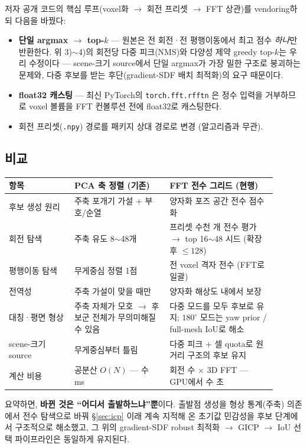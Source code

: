 저자 공개 코드의 핵심 루프(voxel화 $\to$ 회전 프리셋 $\to$ FFT 상관)를
vendoring하되 다음을 바꿨다:
\begin{itemize}
  \item \textbf{단일 argmax $\to$ top-$k$} --- 원본은 전 회전·전
  평행이동에서 최고 점수 \emph{하나}만 반환한다. 위 3)$\sim$4)의 회전당
  다중 피크(NMS)와 다양성 제약 greedy top-$k$는 우리 수정이다 ---
  scene-크기 source에서 단일 argmax가 가장 밀한 구조로 붕괴하는 문제와,
  다중 후보를 받는 후단(gradient-SDF 배치 최적화)의 요구 때문이다.
  \item \textbf{float32 캐스팅} --- 최신 PyTorch의 \texttt{torch.fft.rfftn}
  은 정수 입력을 거부하므로 voxel 볼륨을 FFT 컨볼루션 전에 float32로
  캐스팅한다.
  \item 회전 프리셋(\texttt{.npy}) 경로를 패키지 상대 경로로 변경
  (알고리즘과 무관).
\end{itemize}

\subsection{비교}

\begin{longtable}{p{0.22\linewidth}p{0.32\linewidth}p{0.36\linewidth}}
\toprule
\textbf{항목} & \textbf{PCA 축 정렬 (기존)} & \textbf{FFT 전수 그리드 (현행)} \\
\midrule
후보 생성 원리 & 주축 포개기 가설 + 부호/순열 & 양자화 포즈 공간 전수 점수화 \\
회전 탐색 & 주축 유도 8$\sim$48개 & 프리셋 수천 개 전수 평가 $\to$
  top 16$\sim$48 시드 (확장 후 $\le128$) \\
평행이동 탐색 & 무게중심 정렬 1점 & 전 voxel 격자 전수 (FFT로 일괄) \\
전역성 & 주축 가설이 맞을 때만 & 양자화 해상도 내에서 보장 \\
대칭·평면 형상 & 주축 자체가 모호 $\to$ 후보군 전체가 무의미해질 수
  있음 & 다중 모드를 모두 후보로 유지; $180^\circ$ 모드는 yaw prior /
  full-mesh IoU로 해소 \\
scene-크기 source & 무게중심부터 틀림 & 다중 피크 + 셀 quota로 원거리
  구조의 후보 유지 \\
계산 비용 & 공분산 $O(N)$ --- 수 ms & 회전 수 $\times$ 3D FFT --- GPU에서
  수 초 \\
\bottomrule
\end{longtable}

요약하면, \textbf{바뀐 것은 ``어디서 출발하느냐''뿐}이다. 출발점 생성을
형상 통계(주축) 의존에서 전수 탐색으로 바꿔 \S\ref{sec:icp} 이래 계속
지적해 온 초기값 민감성을 후보 단계에서 구조적으로 해소했고, 그 위의
gradient-SDF robust 최적화 $\to$ GICP $\to$ IoU 선택 파이프라인은 동일하게
유지된다.

